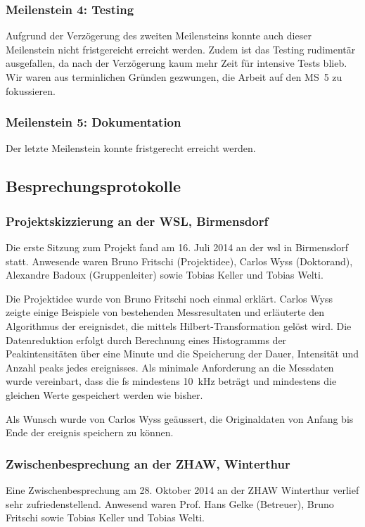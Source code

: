 \subsubsection{Meilenstein 4: Testing}
Aufgrund der Verzögerung des zweiten Meilensteins konnte auch dieser Meilenstein nicht fristgereicht erreicht werden. Zudem ist das Testing rudimentär ausgefallen, da nach der Verzögerung kaum mehr Zeit für intensive Tests blieb. Wir waren aus terminlichen Gründen gezwungen, die Arbeit auf den MS~5 zu fokussieren.

\subsubsection{Meilenstein 5: Dokumentation}
Der letzte Meilenstein konnte fristgerecht erreicht werden.


\subsection{Besprechungsprotokolle}

\subsubsection{Projektskizzierung an der WSL, Birmensdorf}
Die erste Sitzung zum Projekt fand am 16. Juli 2014 an der \gls{wsl} in Birmensdorf statt. Anwesende waren Bruno Fritschi (Projektidee), Carlos Wyss (Doktorand), Alexandre Badoux (Gruppenleiter) sowie Tobias Keller und Tobias Welti.

Die Projektidee wurde von Bruno Fritschi noch einmal erklärt. Carlos Wyss zeigte einige Beispiele von bestehenden Messresultaten und erläuterte den Algorithmus der \gls{ereignisdet}, die mittels Hilbert-Transformation gelöst wird. Die Datenreduktion erfolgt durch Berechnung eines Histogramms der Peakintensitäten über eine Minute und die Speicherung der Dauer, Intensität und Anzahl \glspl{peak} jedes \gls{ereignis}ses. Als minimale Anforderung an die Messdaten wurde vereinbart, dass die \gls{fs} mindestens 10~kHz beträgt und mindestens die gleichen Werte gespeichert werden wie bisher.

Als Wunsch wurde von Carlos Wyss geäussert, die Originaldaten von Anfang bis Ende der \gls{ereignis} speichern zu können.


\subsubsection{Zwischenbesprechung an der ZHAW, Winterthur}
Eine Zwischenbesprechung am 28. Oktober 2014 an der ZHAW Winterthur verlief sehr zufriedenstellend. Anwesend waren Prof. Hans Gelke (Betreuer), Bruno Fritschi sowie Tobias Keller und Tobias Welti.

